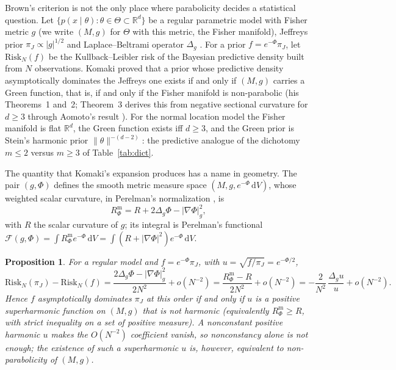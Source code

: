 \documentclass[11pt]{amsart}
\newcommand{\R}{\mathbb{R}}
\newcommand{\dd}{\,\mathrm{d}}
\newcommand{\abs}[1]{\lvert #1\rvert}
\newcommand{\norm}[1]{\lVert #1\rVert}
\theoremstyle{plain}
\newtheorem{proposition}[theorem]{Proposition}
\theoremstyle{definition}
\theoremstyle{remark}
\begin{document}
Brown's criterion is not the only place where parabolicity decides a
statistical question. Let $\{p(x\mid\theta):\theta\in\Theta\subset\R^d\}$ be a
regular parametric model with Fisher metric $g$ (we write $(M,g)$ for $\Theta$
with this metric, the Fisher manifold), Jeffreys prior
$\pi_J\propto\abs g^{1/2}$ and Laplace--Beltrami operator $\Delta_g$
\cite{amari2000}. For a prior $f=e^{-\Phi}\pi_J$, let $\mathrm{Risk}_N(f)$ be
the Kullback--Leibler risk of the Bayesian predictive density built from $N$
observations. Komaki \cite{komaki2006} proved that a prior whose predictive
density asymptotically dominates the Jeffreys one exists if and only if $(M,g)$
carries a Green function, that is, if and only if the Fisher manifold is
non-parabolic (his Theorems~1 and~2; Theorem~3 derives this from negative
sectional curvature for $d\ge3$ through Aomoto's result \cite{aomoto1966}). For
the normal location model the Fisher manifold is flat $\R^d$, the Green
function exists iff $d\ge3$, and the Green prior is Stein's harmonic prior
$\norm\theta^{-(d-2)}$: the predictive analogue of the dichotomy $m\le2$ versus
$m\ge3$ of Table~\ref{tab:dict}.

The quantity that Komaki's expansion produces has a name in geometry. The pair
$(g,\Phi)$ defines the smooth metric measure space $(M,g,e^{-\Phi}\dd V)$,
whose weighted scalar curvature, in Perelman's normalization
\cite[Remark~1.3]{perelman2002}, is
\begin{equation}\label{eq:perelman}
R^{\mathrm m}_\Phi=R+2\Delta_g\Phi-\abs{\nabla\Phi}_g^2 ,
\end{equation}
with $R$ the scalar curvature of $g$; its integral is Perelman's functional
$\mathcal F(g,\Phi)=\int R^{\mathrm m}_\Phi e^{-\Phi}\dd V=\int(R+\abs{\nabla\Phi}^2)e^{-\Phi}\dd V$.

\begin{proposition}\label{prop:komaki}
For a regular model and $f=e^{-\Phi}\pi_J$, with $u=\sqrt{f/\pi_J}=e^{-\Phi/2}$,
\begin{equation}\label{eq:k1}
\mathrm{Risk}_N(\pi_J)-\mathrm{Risk}_N(f)
=\frac{2\Delta_g\Phi-\abs{\nabla\Phi}_g^2}{2N^2}+o(N^{-2})
=\frac{R^{\mathrm m}_\Phi-R}{2N^2}+o(N^{-2})
=-\frac{2}{N^2}\,\frac{\Delta_gu}{u}+o(N^{-2}).
\end{equation}
Hence $f$ asymptotically dominates $\pi_J$ at this order if and only if $u$ is a
positive superharmonic function on $(M,g)$ that is not harmonic (equivalently
$R^{\mathrm m}_\Phi\ge R$, with strict inequality on a set of positive measure).
A nonconstant positive \emph{harmonic} $u$ makes the $O(N^{-2})$ coefficient
vanish, so nonconstancy alone is not enough; the existence of such a
superharmonic $u$ is, however, equivalent to non-parabolicity of $(M,g)$.
\end{proposition}
\end{document}
